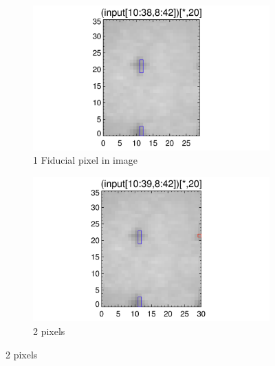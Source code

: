 \documentclass[10pt]{article}
\begin{document}
\begin{figure}[!h]
    \centering 
    \begin{subfigure}[b]{.45\linewidth}
        \centering
        \includegraphics[width=1.3\textwidth]{plots_tables_images/fidcheck_withbothtruncate0.png}
        \caption{1 Fiducial pixel in image}
    \end{subfigure}
    \begin{subfigure}[b]{.45\linewidth}
        \centering
        \includegraphics[width=1.3\textwidth]{plots_tables_images/fidcheck_withbothtruncate1.png}
        \caption{2 pixels}
    \end{subfigure}
   

\end{figure}
\end{document}
